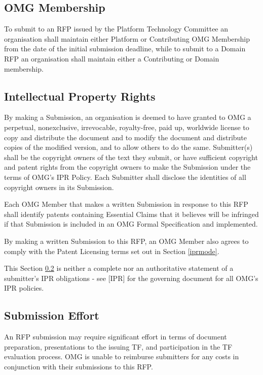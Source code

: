 \subsection{OMG Membership}

To submit to an RFP issued by the Platform Technology Committee an organisation shall maintain either Platform or Contributing OMG Membership from the date of the initial submission deadline, while to submit to a Domain RFP an organisation shall maintain either a Contributing or Domain membership.

\subsection{Intellectual Property Rights}
\label{ipr}
By making a Submission, an organisation is deemed to have granted to OMG a perpetual, nonexclusive, irrevocable, royalty-free, paid up, worldwide license to copy and distribute the document and to modify the document and distribute copies of the modified version, and to allow others to do the same. Submitter(s) shall be the copyright owners of the text they submit, or have sufficient copyright and patent rights from the copyright owners to make the Submission under the terms of OMG's IPR Policy. Each Submitter shall disclose the identities of all copyright owners in its Submission.

Each OMG Member that makes a written Submission in response to this RFP shall identify patents containing Essential Claims that it believes will be infringed if that Submission is included in an OMG Formal Specification and implemented.

By making a written Submission to this RFP, an OMG Member also agrees to comply with the Patent Licensing terms set out in Section \ref{iprmode}.

This Section \ref{ipr} is neither a complete nor an authoritative statement of a submitter's IPR obligations - see [IPR] for the governing document for all OMG's IPR policies. 


\subsection{Submission Effort}

An RFP submission may require significant effort in terms of document preparation, presentations to the issuing TF, and participation in the TF evaluation process. OMG is unable to reimburse submitters for any costs in conjunction with their submissions to this RFP.


